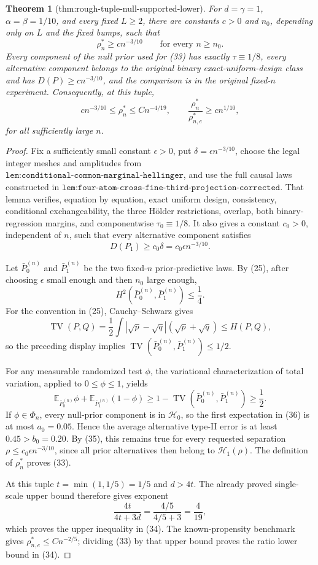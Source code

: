 \documentclass{article}
\newtheorem{theorem}{Theorem}
\begin{document}
\begin{theorem}[thm:rough-tuple-null-supported-lower]\label{thm:rough-tuple-null-supported-lower}
For \(d=\gamma=1\), \(\alpha=\beta=1/10\), and every fixed \(L\geq2\), there are constants \(c>0\) and \(n_0\), depending only on \(L\) and the fixed bumps, such that
\[
 \rho_n^*\geq c n^{-3/10}
 \qquad\text{for every }n\geq n_0.
 \tag{33}
\]
Every component of the null prior used for (33) has exactly \(\tau\equiv1/8\), every alternative component belongs to the original binary exact-uniform-design class and has \(D(P)\geq c n^{-3/10}\), and the comparison is in the original fixed-\(n\) experiment.  Consequently, at this tuple,
\[
 c n^{-3/10}\leq\rho_n^*\leq Cn^{-4/19},
 \qquad
 \frac{\rho_n^*}{\rho_{n,e}^*}\geq c n^{1/10},
 \tag{34}
\]
for all sufficiently large \(n\).
\end{theorem}
\begin{proof}
Fix a sufficiently small constant \(\epsilon>0\), put \(\delta=\epsilon n^{-3/10}\), choose the legal integer meshes and amplitudes from \(\texttt{lem:conditional-common-marginal-hellinger}\), and use the full causal laws constructed in \(\texttt{lem:four-atom-cross-fine-third-projection-corrected}\).  That lemma verifies, equation by equation, exact uniform design, consistency, conditional exchangeability, the three Hölder restrictions, overlap, both binary-regression margins, and componentwise \(\tau_0\equiv1/8\).  It also gives a constant \(c_0>0\), independent of \(n\), such that every alternative component satisfies
\[
 D(P_1)\geq c_0\delta=c_0\epsilon n^{-3/10}.
 \tag{35}
\]

Let \(\bar P_0^{(n)}\) and \(\bar P_1^{(n)}\) be the two fixed-\(n\) prior-predictive laws.  By (25), after choosing \(\epsilon\) small enough and then \(n_0\) large enough,
\[
 H^2(\bar P_0^{(n)},\bar P_1^{(n)})\leq\frac14.
\]
For the convention in (25), Cauchy--Schwarz gives
\[
 \operatorname{TV}(P,Q)
 =\frac12\int|\sqrt p-\sqrt q|(\sqrt p+\sqrt q)
 \leq H(P,Q),
\]
so the preceding display implies \(\operatorname{TV}(\bar P_0^{(n)},\bar P_1^{(n)})\leq1/2\).

For any measurable randomized test \(\phi\), the variational characterization of total variation, applied to \(0\leq\phi\leq1\), yields
\[
 \mathbb E_{\bar P_0^{(n)}}\phi
 +\mathbb E_{\bar P_1^{(n)}}(1-\phi)
 \geq1-\operatorname{TV}(\bar P_0^{(n)},\bar P_1^{(n)})
 \geq\frac12.
 \tag{36}
\]
If \(\phi\in\Phi_n\), every null-prior component is in \(\mathcal H_0\), so the first expectation in (36) is at most \(a_0=0.05\).  Hence the average alternative type-II error is at least \(0.45>b_0=0.20\).  By (35), this remains true for every requested separation \(\rho\leq c_0\epsilon n^{-3/10}\), since all prior alternatives then belong to \(\mathcal H_1(\rho)\).  The definition of \(\rho_n^*\) proves (33).

At this tuple \(t=\min(1,1/5)=1/5\) and \(d>4t\).  The already proved single-scale upper bound therefore gives exponent
\[
 \frac{4t}{4t+3d}=\frac{4/5}{4/5+3}=\frac4{19},
\]
which proves the upper inequality in (34).  The known-propensity benchmark gives \(\rho_{n,e}^*\leq Cn^{-2/5}\); dividing (33) by that upper bound proves the ratio lower bound in (34).
\end{proof}
\end{document}
